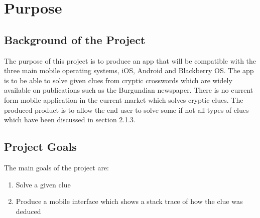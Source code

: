 \section{Purpose}

\subsection{Background of the Project}

The purpose of this project is to produce an app that will be compatible with the three main mobile operating systems, iOS, Android and Blackberry OS. The app is to be able to solve given clues from cryptic crosswords which are widely available on publications such as the Burgundian newspaper. There is no current form mobile application in the current market which solves cryptic clues. The produced product is to allow the end user to solve some if not all types of clues which have been discussed in section 2.1.3.

\subsection{Project Goals}

The main goals of the project are:

\begin{enumerate}
  \item Solve a given clue
  \item Produce a mobile interface which shows a stack trace of how the clue was deduced
\end{enumerate}

